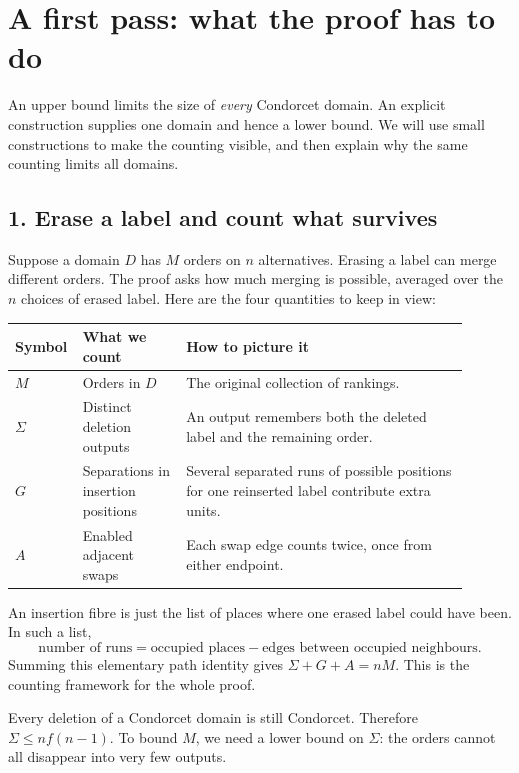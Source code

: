 \section*{A first pass: what the proof has to do}\label{sec:first-pass}
An upper bound limits the size of \emph{every} Condorcet domain.
An explicit construction supplies one domain and hence a lower bound.
We will use small constructions to make the counting visible, and
then explain why the same counting limits all domains.

\subsection*{1. Erase a label and count what survives}
Suppose a domain \(D\) has \(M\) orders on \(n\) alternatives.
Erasing a label can merge different orders. The proof asks how much
merging is possible, averaged over the \(n\) choices of erased label.
Here are the four quantities to keep in view:
\begin{center}\small
\begin{tabular}{@{}>{\raggedright\arraybackslash}p{0.08\linewidth}>{\raggedright\arraybackslash}p{0.22\linewidth}>{\raggedright\arraybackslash}p{0.60\linewidth}@{}}\toprule
Symbol & What we count & How to picture it\\\midrule
\(M\) & Orders in \(D\) & The original collection of rankings.\\[0.35em]
\(\Sigma\) & Distinct deletion outputs & An output remembers both the deleted label and the remaining order.\\[0.35em]
\(G\) & Separations in insertion positions & Several separated runs of possible positions for one reinserted label contribute extra units.\\[0.35em]
\(A\) & Enabled adjacent swaps & Each swap edge counts twice, once from either endpoint.\\\bottomrule
\end{tabular}
\end{center}
An insertion fibre is just the list of places where one erased label
could have been. In such a list,
\[
 \text{number of runs}=\text{occupied places}-\text{edges between occupied neighbours}.
\]
Summing this elementary path identity gives
\(\Sigma+G+A=nM\). This is the counting framework for the whole proof.

Every deletion of a Condorcet domain is still Condorcet. Therefore
\(\Sigma\leq nf(n-1)\). To bound \(M\), we need a lower bound
on \(\Sigma\): the orders cannot all disappear into very few outputs.

